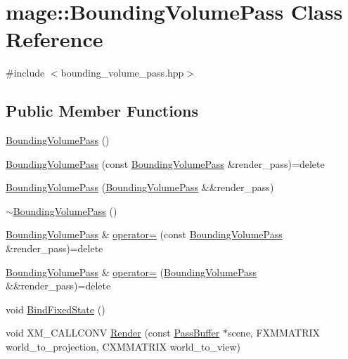 \hypertarget{classmage_1_1_bounding_volume_pass}{}\section{mage\+:\+:Bounding\+Volume\+Pass Class Reference}
\label{classmage_1_1_bounding_volume_pass}


{\ttfamily \#include $<$bounding\+\_\+volume\+\_\+pass.\+hpp$>$}

\subsection*{Public Member Functions}
\begin{DoxyCompactItemize}
\item 
\hyperlink{classmage_1_1_bounding_volume_pass_ab32eb9086e463f5260f8999b78b55b26}{Bounding\+Volume\+Pass} ()
\item 
\hyperlink{classmage_1_1_bounding_volume_pass_a21408cc53051c9c6d94efe41b3bea404}{Bounding\+Volume\+Pass} (const \hyperlink{classmage_1_1_bounding_volume_pass}{Bounding\+Volume\+Pass} \&render\+\_\+pass)=delete
\item 
\hyperlink{classmage_1_1_bounding_volume_pass_a4c40fde630e6ff9bf466293c7bc94157}{Bounding\+Volume\+Pass} (\hyperlink{classmage_1_1_bounding_volume_pass}{Bounding\+Volume\+Pass} \&\&render\+\_\+pass)
\item 
\hyperlink{classmage_1_1_bounding_volume_pass_a41dc433aed26f05e8b60462a6e337509}{$\sim$\+Bounding\+Volume\+Pass} ()
\item 
\hyperlink{classmage_1_1_bounding_volume_pass}{Bounding\+Volume\+Pass} \& \hyperlink{classmage_1_1_bounding_volume_pass_a2115e9af06e0bc7e42fc95e10f0dacad}{operator=} (const \hyperlink{classmage_1_1_bounding_volume_pass}{Bounding\+Volume\+Pass} \&render\+\_\+pass)=delete
\item 
\hyperlink{classmage_1_1_bounding_volume_pass}{Bounding\+Volume\+Pass} \& \hyperlink{classmage_1_1_bounding_volume_pass_a3887d5ffbb5e175187004f0b057ddcaa}{operator=} (\hyperlink{classmage_1_1_bounding_volume_pass}{Bounding\+Volume\+Pass} \&\&render\+\_\+pass)=delete
\item 
void \hyperlink{classmage_1_1_bounding_volume_pass_a67c802211155c0eae3e15343244ba2c4}{Bind\+Fixed\+State} ()
\item 
void X\+M\+\_\+\+C\+A\+L\+L\+C\+O\+NV \hyperlink{classmage_1_1_bounding_volume_pass_ae352f2fd1c7db9309ba873ad84d9933f}{Render} (const \hyperlink{structmage_1_1_pass_buffer}{Pass\+Buffer} $\ast$scene, F\+X\+M\+M\+A\+T\+R\+IX world\+\_\+to\+\_\+projection, C\+X\+M\+M\+A\+T\+R\+IX world\+\_\+to\+\_\+view)
\end{DoxyCompactItemize}
